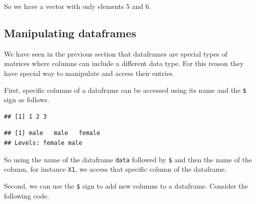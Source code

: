 \documentclass[
]{book}
\newenvironment{Shaded}{\begin{snugshade}}{\end{snugshade}}
\newcommand{\AttributeTok}[1]{\textcolor[rgb]{0.77,0.63,0.00}{#1}}
\newcommand{\ConstantTok}[1]{\textcolor[rgb]{0.00,0.00,0.00}{#1}}
\newcommand{\DecValTok}[1]{\textcolor[rgb]{0.00,0.00,0.81}{#1}}
\newcommand{\FunctionTok}[1]{\textcolor[rgb]{0.00,0.00,0.00}{#1}}
\newcommand{\NormalTok}[1]{#1}
\newcommand{\OtherTok}[1]{\textcolor[rgb]{0.56,0.35,0.01}{#1}}
\newcommand{\SpecialCharTok}[1]{\textcolor[rgb]{0.00,0.00,0.00}{#1}}
\newcommand{\StringTok}[1]{\textcolor[rgb]{0.31,0.60,0.02}{#1}}
\begin{document}
So we have a vector with only elements 5 and 6.

\hypertarget{manipulating-dataframes}{%
\subsection{Manipulating dataframes}\label{manipulating-dataframes}}

We have seen in the previous section that dataframes are special types of matrices where columns can include a different data type. For this reason they have special way to manipulate and access their entries.

First, specific columns of a dataframe can be accessed using its name and the \texttt{\$} sign as follows.

\begin{Shaded}
\end{Shaded}

\begin{verbatim}
## [1] 1 2 3
\end{verbatim}

\begin{Shaded}
\end{Shaded}

\begin{verbatim}
## [1] male   male   female
## Levels: female male
\end{verbatim}

So using the name of the dataframe \texttt{data} followed by \texttt{\$} and then the name of the column, for instance \texttt{X1}, we access that specific column of the dataframe.

Second, we can use the \texttt{\$} sign to add new columns to a dataframe. Consider the following code.
\end{document}
